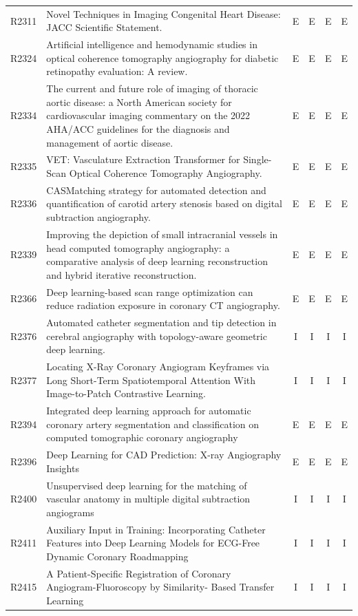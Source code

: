 \begin{longtable}{@{}l p{8.6cm} c c c c@{}}
R2311 & Novel Techniques in Imaging Congenital Heart Disease: JACC Scientific Statement. & E & E & E & E \\
R2324 & Artificial intelligence and hemodynamic studies in optical coherence tomography angiography for diabetic retinopathy evaluation: A review. & E & E & E & E \\
R2334 & The current and future role of imaging of thoracic aortic disease: a North American society for cardiovascular imaging commentary on the 2022 AHA/ACC guidelines for the diagnosis and management of aortic disease. & E & E & E & E \\
R2335 & VET: Vasculature Extraction Transformer for Single-Scan Optical Coherence Tomography Angiography. & E & E & E & E \\
R2336 & CASMatching strategy for automated detection and quantification of carotid artery stenosis based on digital subtraction angiography. & E & E & E & E \\
R2339 & Improving the depiction of small intracranial vessels in head computed tomography angiography: a comparative analysis of deep learning reconstruction and hybrid iterative reconstruction. & E & E & E & E \\
R2366 & Deep learning-based scan range optimization can reduce radiation exposure in coronary CT angiography. & E & E & E & E \\
R2376 & Automated catheter segmentation and tip detection in cerebral angiography with topology-aware geometric deep learning. & I & I & I & I \\
R2377 & Locating X-Ray Coronary Angiogram Keyframes via Long Short-Term Spatiotemporal Attention With Image-to-Patch Contrastive Learning. & I & I & I & I \\
R2394 & Integrated deep learning approach for automatic coronary artery segmentation and classification on computed tomographic coronary angiography & E & E & E & E \\
R2396 & Deep Learning for CAD Prediction: X-ray Angiography Insights & E & E & E & E \\
R2400 & Unsupervised deep learning for the matching of vascular anatomy in multiple digital subtraction angiograms & I & I & I & I \\
R2411 & Auxiliary Input in Training: Incorporating Catheter Features into Deep Learning Models for ECG-Free Dynamic Coronary Roadmapping & I & I & I & I \\
R2415 & A Patient-Specific Registration of Coronary Angiogram-Fluoroscopy by Similarity- Based Transfer Learning & I & I & I & I \\

\end{longtable}
